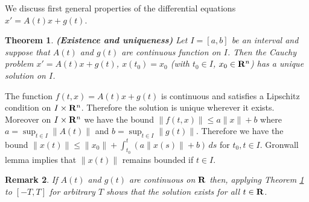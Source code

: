 \documentclass[12pt]{report}
\newcommand{\bR}{{\bf R}}
\newtheorem{theorem}{Theorem}[section]
\newtheorem{remark}[theorem]{Remark}
\newcommand{\proof}{\noindent {\em Proof:~}}
\def\qed{\hbox{\hskip 6pt\vrule width6pt height7pt depth1pt
    \hskip1pt}\bigskip}
\begin{document}
We discuss first general properties of the differential equations
$x'=A(t)x + g(t)$.

\begin{theorem}\label{exunli}
{\bf (Existence and uniqueness)} Let $I=[a,b]$ be an interval and suppose 
that $A(t)$ and $g(t)$ are continuous
function on $I$. Then the Cauchy problem $x'=A(t)x + g(t)$,
$x(t_0)=x_0$ (with $t_0 \in I$, $x_0 \in \bR^n$) has a unique solution
on $I$.
\end{theorem}

\proof The function $f(t,x)=A(t)x + g(t)$ is continuous and satisfies a
Lipschitz condition on $I \times \bR^n$. Therefore the solution is
unique wherever it exists. Moreover on $I \times \bR^n$ we have the
bound $\|f(t,x)\| \le a \|x\| + b$ where $a = \sup_{t \in I} \|A(t)\|$
and $b = \sup_{t\in I} \|g(t)\|$.  Therefore we have the bound $\|
x(t) \| \le \|x_0\| + \int_{t_0}^t (a \|x(s)\| + b) \, ds$ for $t_0,t
\in I$.  Gronwall lemma implies that $\|x(t)\|$ remains bounded if $t
\in I$. \hfill \qed

\begin{remark}{\rm If $A(t)$ and $g(t)$ are continuous on $\bR$ then, applying Theorem  
\ref{exunli} to  $[-T,T]$ for arbitrary $T$ shows that the solution exists for all $t \in \bR$.
}
\end{remark}
\end{document}
